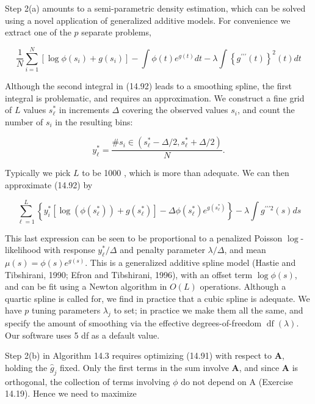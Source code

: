\documentclass[10pt]{article}
\begin{document}
Step 2(a) amounts to a semi-parametric density estimation, which can be solved using a novel application of generalized additive models. For convenience we extract one of the $p$ separate problems,


\begin{equation*}
\frac{1}{N} \sum_{i=1}^{N}\left[\log \phi\left(s_{i}\right)+g\left(s_{i}\right)\right]-\int \phi(t) e^{g(t)} d t-\lambda \int\left\{g^{\prime \prime \prime}(t)\right\}^{2}(t) d t \tag{14.92}
\end{equation*}


Although the second integral in (14.92) leads to a smoothing spline, the first integral is problematic, and requires an approximation. We construct a fine grid of $L$ values $s_{\ell}^{*}$ in increments $\Delta$ covering the observed values $s_{i}$, and count the number of $s_{i}$ in the resulting bins:


\begin{equation*}
y_{\ell}^{*}=\frac{\# s_{i} \in\left(s_{\ell}^{*}-\Delta / 2, s_{\ell}^{*}+\Delta / 2\right)}{N} . \tag{14.93}
\end{equation*}


Typically we pick $L$ to be 1000 , which is more than adequate. We can then approximate (14.92) by


\begin{equation*}
\sum_{\ell=1}^{L}\left\{y_{i}^{*}\left[\log \left(\phi\left(s_{\ell}^{*}\right)\right)+g\left(s_{\ell}^{*}\right)\right]-\Delta \phi\left(s_{\ell}^{*}\right) e^{g\left(s_{\ell}^{*}\right)}\right\}-\lambda \int g^{\prime \prime \prime 2}(s) d s \tag{14.94}
\end{equation*}


This last expression can be seen to be proportional to a penalized Poisson $\log$-likelihood with response $y_{\ell}^{*} / \Delta$ and penalty parameter $\lambda / \Delta$, and mean $\mu(s)=\phi(s) e^{g(s)}$. This is a generalized additive spline model (Hastie and Tibshirani, 1990; Efron and Tibshirani, 1996), with an offset term $\log \phi(s)$, and can be fit using a Newton algorithm in $O(L)$ operations. Although a quartic spline is called for, we find in practice that a cubic spline is adequate. We have $p$ tuning parameters $\lambda_{j}$ to set; in practice we make them all the same, and specify the amount of smoothing via the effective degrees-of-freedom $\operatorname{df}(\lambda)$. Our software uses 5 df as a default value.

Step 2(b) in Algorithm 14.3 requires optimizing (14.91) with respect to $\mathbf{A}$, holding the $\hat{g}_{j}$ fixed. Only the first terms in the sum involve $\mathbf{A}$, and since $\mathbf{A}$ is orthogonal, the collection of terms involving $\phi$ do not depend on A (Exercise 14.19). Hence we need to maximize
\end{document}
